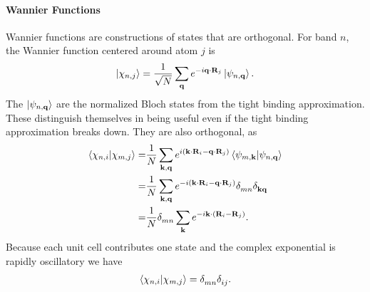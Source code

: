 \paragraph{Wannier Functions}
Wannier functions are constructions of states that are orthogonal. For band $n$, the Wannier function centered around atom $j$ is
\begin{align*}
	\ket{\chi_{n, j}} = \frac{1}{\sqrt{N}}\sum\limits_{\vb{q}}e^{-i\vb{q}\cdot\vb{R}_{j}}\ket{\psi_{n, \vb{q}}}.
\end{align*}
The $\ket{\psi_{n, \vb{q}}}$ are the normalized Bloch states from the tight binding approximation. These distinguish themselves in being useful even if the tight binding approximation breaks down. They are also orthogonal, as
\begin{align*}
	\braket{\chi_{n, i}}{\chi_{m, j}} =& \frac{1}{N}\sum\limits_{\vb{k}, \vb{q}}e^{i(\vb{k}\cdot\vb{R}_{i} - \vb{q}\cdot\vb{R}_{j})}\braket{\psi_{m, \vb{k}}}{\psi_{n, \vb{q}}} \\
	                                  =& \frac{1}{N}\sum\limits_{\vb{k}, \vb{q}}e^{-i(\vb{k}\cdot\vb{R}_{i} - \vb{q}\cdot\vb{R}_{j})}\kdelta{}{mn}\kdelta{}{\vb{k}\vb{q}} \\
	                                  =& \frac{1}{N}\kdelta{}{mn}\sum\limits_{\vb{k}}e^{-i\vb{k}\cdot(\vb{R}_{i} - \vb{R}_{j})}.
\end{align*}
Because each unit cell contributes one state and the complex exponential is rapidly oscillatory we have
\begin{align*}
	\braket{\chi_{n, i}}{\chi_{m, j}} = \kdelta{}{mn}\kdelta{}{ij}.
\end{align*}

